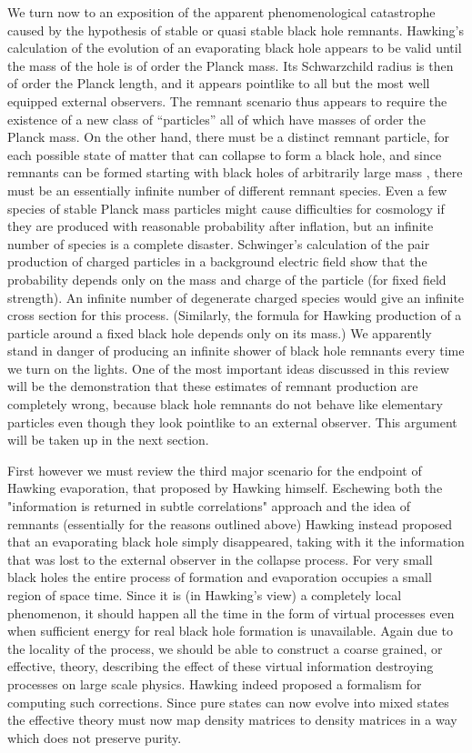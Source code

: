 We turn now to an exposition of the
apparent phenomenological catastrophe caused by the hypothesis of stable
or
quasi
stable black hole remnants.
Hawking's calculation of the evolution of an evaporating black hole appears to
be valid until the mass of the hole is of order the Planck mass.  Its
Schwarzchild radius is then of order the Planck length, and it appears
pointlike
to all but the most well equipped external observers.  The remnant scenario
thus appears to require the existence of a new class of ``particles''
all of which have masses of order the Planck mass.  On the other hand,
there must be a distinct remnant particle,
for each possible state of matter that can collapse to form a black
hole, and since remnants can be formed starting with black holes of
arbitrarily
large mass , there must be an essentially infinite number of different
remnant species.
Even a few species of stable Planck mass particles might cause
difficulties for cosmology if they are produced with reasonable probability
after inflation, but an infinite number of species is a complete disaster.
Schwinger's calculation of the pair production of charged particles in
a background electric field show that the probability depends only on
the mass
and charge of the particle (for fixed field strength).  An infinite
number of
degenerate charged species would give an infinite cross section for this
process.  (Similarly, the formula for Hawking production of a particle
around a
fixed black hole depends only on its mass.)  We apparently stand in
danger of
producing an infinite shower of black hole remnants every time we turn
on the
lights.  One of the most important ideas discussed in this review will be the
demonstration that these estimates of remnant production are completely wrong,
because black hole remnants do not behave like elementary particles even though
they look pointlike to an external observer.  This argument will be
taken up
in the next section.


First however we must review the third major scenario for the endpoint
of
Hawking evaporation, that proposed by Hawking himself.  Eschewing both
the
"information is returned in subtle correlations" approach and the idea
of
remnants (essentially for the reasons outlined above) Hawking instead
proposed that an evaporating black hole simply disappeared, taking with it
the information that was lost to the external observer in the collapse process.
For very small black holes the entire process of formation and
evaporation
occupies a small region of space time.  Since it is (in Hawking's view)
a
completely local phenomenon, it should happen all the time in the form
of
virtual processes even when sufficient energy for real black hole
formation is
unavailable.  Again due to the locality of the process, we should be
able to
construct a coarse grained, or effective, theory, describing the effect of
these virtual information destroying processes on large scale physics.
Hawking indeed proposed a formalism for computing such corrections.
Since pure states can now evolve into mixed states the effective theory
must
now map density matrices to density matrices in a way which does not
preserve
purity.

